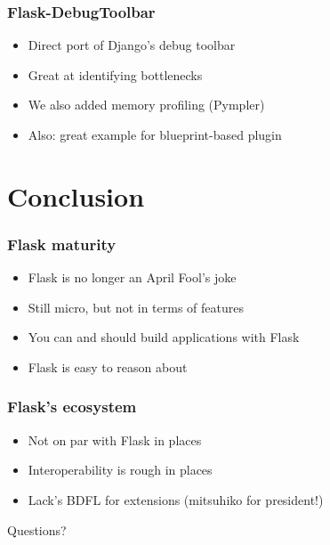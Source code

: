 \documentclass[14pt]{beamer}
\begin{document}
\begin{frame}
  \frametitle{Flask-DebugToolbar}
  \begin{itemize}
  \item Direct port of Django's debug toolbar
  \item Great at identifying bottlenecks
  \item We also added memory profiling (Pympler)
  \item Also: great example for blueprint-based plugin
  \end{itemize}
\end{frame}

\section{Conclusion}

\begin{frame}
  \frametitle{Flask maturity}
  \begin{itemize}
  \item Flask is no longer an April Fool's joke
  \item Still micro, but not in terms of features
  \item You can and should build applications with Flask
  \item Flask is easy to reason about
  \end{itemize}
\end{frame}

\begin{frame}
  \frametitle{Flask's ecosystem}
  \begin{itemize}
  \item Not on par with Flask in places
  \item Interoperability is rough in places
  \item Lack's BDFL for extensions (mitsuhiko for president!)
  \end{itemize}
\end{frame}

\begin{frame}
  \begin{center}
    \LARGE{Questions?}
  \end{center}
\end{frame}
\end{document}
